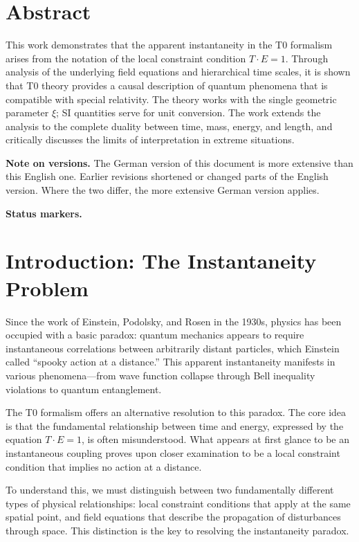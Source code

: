 \section*{Abstract}
		This work demonstrates that the apparent instantaneity in the T0 formalism arises from the notation of the local constraint condition $T \cdot E = 1$. Through analysis of the underlying field equations and hierarchical time scales, it is shown that T0 theory provides a causal description of quantum phenomena that is compatible with special relativity. The theory works with the single geometric parameter $\xi$; SI quantities serve for unit conversion. The work extends the analysis to the complete duality between time, mass, energy, and length, and critically discusses the limits of interpretation in extreme situations.

	\medskip\noindent\textbf{Note on versions.} The German version of this document is more extensive than this English one. Earlier revisions shortened or changed parts of the English version. Where the two differ, the more extensive German version applies.


	\medskip\noindent\textbf{Status markers.}
	


	\hypersetup{linkcolor=blue}

	\section{Introduction: The Instantaneity Problem}
	
	Since the work of Einstein, Podolsky, and Rosen in the 1930s, physics has been occupied with a basic paradox: quantum mechanics appears to require instantaneous correlations between arbitrarily distant particles, which Einstein called ``spooky action at a distance.'' This apparent instantaneity manifests in various phenomena—from wave function collapse through Bell inequality violations to quantum entanglement.
	
	The T0 formalism offers an alternative resolution to this paradox. The core idea is that the fundamental relationship between time and energy, expressed by the equation $T \cdot E = 1$, is often misunderstood. What appears at first glance to be an instantaneous coupling proves upon closer examination to be a local constraint condition that implies no action at a distance.
	
	To understand this, we must distinguish between two fundamentally different types of physical relationships: local constraint conditions that apply at the same spatial point, and field equations that describe the propagation of disturbances through space. This distinction is the key to resolving the instantaneity paradox.
	
